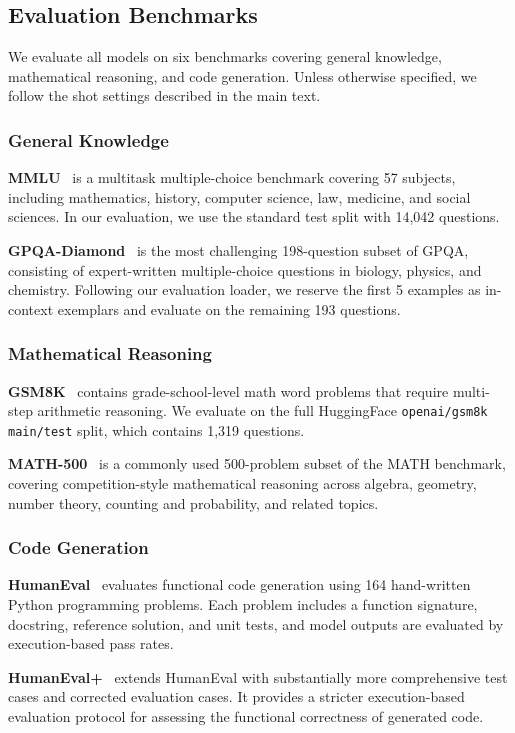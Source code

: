 \subsection{Evaluation Benchmarks}

We evaluate all models on six benchmarks covering general knowledge, mathematical reasoning, and code generation. 
Unless otherwise specified, we follow the shot settings described in the main text.

\subsubsection{General Knowledge}

\textbf{MMLU}~\citep{mmlu} is a multitask multiple-choice benchmark covering 57 subjects, including mathematics, history, computer science, law, medicine, and social sciences. 
In our evaluation, we use the standard test split with 14{,}042 questions.

\textbf{GPQA-Diamond}~\citep{gpqa} is the most challenging 198-question subset of GPQA, consisting of expert-written multiple-choice questions in biology, physics, and chemistry. 
Following our evaluation loader, we reserve the first 5 examples as in-context exemplars and evaluate on the remaining 193 questions.

\subsubsection{Mathematical Reasoning}

\textbf{GSM8K}~\citep{gsm8k} contains grade-school-level math word problems that require multi-step arithmetic reasoning. 
We evaluate on the full HuggingFace \texttt{openai/gsm8k} \texttt{main/test} split, which contains 1{,}319 questions.

\textbf{MATH-500}~\citep{math500} is a commonly used 500-problem subset of the MATH benchmark, covering competition-style mathematical reasoning across algebra, geometry, number theory, counting and probability, and related topics.

\subsubsection{Code Generation}

\textbf{HumanEval}~\citep{humaneval} evaluates functional code generation using 164 hand-written Python programming problems. 
Each problem includes a function signature, docstring, reference solution, and unit tests, and model outputs are evaluated by execution-based pass rates.

\textbf{HumanEval+}~\citep{humaneval_plus} extends HumanEval with substantially more comprehensive test cases and corrected evaluation cases. 
It provides a stricter execution-based evaluation protocol for assessing the functional correctness of generated code.